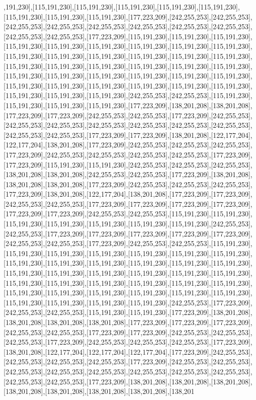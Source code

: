 ,191,230],[115,191,230],[115,191,230],[115,191,230],[115,191,230],[115,191,230],[115,191,230],[115,191,230],[115,191,230],[177,223,209],[242,255,253],[242,255,253],[242,255,253],[242,255,253],[242,255,253],[242,255,253],[242,255,253],[242,255,253],[242,255,253],[242,255,253],[177,223,209],[115,191,230],[115,191,230],[115,191,230],[115,191,230],[115,191,230],[115,191,230],[115,191,230],[115,191,230],[115,191,230],[115,191,230],[115,191,230],[115,191,230],[115,191,230],[115,191,230],[115,191,230],[115,191,230],[115,191,230],[115,191,230],[115,191,230],[115,191,230],[115,191,230],[115,191,230],[115,191,230],[115,191,230],[115,191,230],[115,191,230],[115,191,230],[115,191,230],[115,191,230],[115,191,230],[115,191,230],[115,191,230],[115,191,230],[115,191,230],[115,191,230],[115,191,230],[242,255,253],[242,255,253],[115,191,230],[115,191,230],[115,191,230],[115,191,230],[177,223,209],[138,201,208],[138,201,208],[177,223,209],[177,223,209],[242,255,253],[242,255,253],[177,223,209],[242,255,253],[242,255,253],[242,255,253],[242,255,253],[242,255,253],[242,255,253],[242,255,253],[242,255,253],[242,255,253],[177,223,209],[177,223,209],[138,201,208],[122,177,204],[122,177,204],[138,201,208],[177,223,209],[242,255,253],[242,255,253],[242,255,253],[177,223,209],[242,255,253],[242,255,253],[242,255,253],[242,255,253],[177,223,209],[177,223,209],[115,191,230],[115,191,230],[242,255,253],[242,255,253],[242,255,253],[138,201,208],[138,201,208],[242,255,253],[242,255,253],[177,223,209],[138,201,208],[138,201,208],[138,201,208],[177,223,209],[242,255,253],[242,255,253],[242,255,253],[177,223,209],[138,201,208],[122,177,204],[138,201,208],[177,223,209],[177,223,209],[242,255,253],[242,255,253],[177,223,209],[177,223,209],[177,223,209],[177,223,209],[177,223,209],[177,223,209],[242,255,253],[242,255,253],[115,191,230],[115,191,230],[115,191,230],[115,191,230],[115,191,230],[115,191,230],[115,191,230],[242,255,253],[242,255,253],[177,223,209],[177,223,209],[177,223,209],[177,223,209],[177,223,209],[242,255,253],[242,255,253],[177,223,209],[242,255,253],[242,255,253],[115,191,230],[115,191,230],[115,191,230],[115,191,230],[115,191,230],[115,191,230],[115,191,230],[115,191,230],[115,191,230],[115,191,230],[115,191,230],[115,191,230],[115,191,230],[115,191,230],[115,191,230],[115,191,230],[115,191,230],[115,191,230],[115,191,230],[115,191,230],[115,191,230],[115,191,230],[115,191,230],[115,191,230],[115,191,230],[115,191,230],[115,191,230],[115,191,230],[115,191,230],[115,191,230],[115,191,230],[115,191,230],[115,191,230],[115,191,230],[115,191,230],[242,255,253],[177,223,209],[242,255,253],[242,255,253],[115,191,230],[115,191,230],[177,223,209],[138,201,208],[138,201,208],[138,201,208],[138,201,208],[177,223,209],[177,223,209],[177,223,209],[242,255,253],[242,255,253],[177,223,209],[177,223,209],[242,255,253],[242,255,253],[242,255,253],[177,223,209],[242,255,253],[242,255,253],[242,255,253],[177,223,209],[138,201,208],[122,177,204],[122,177,204],[122,177,204],[177,223,209],[242,255,253],[242,255,253],[242,255,253],[242,255,253],[177,223,209],[242,255,253],[242,255,253],[242,255,253],[242,255,253],[242,255,253],[242,255,253],[242,255,253],[242,255,253],[242,255,253],[242,255,253],[177,223,209],[138,201,208],[138,201,208],[138,201,208],[138,201,208],[138,201,208],[138,201,208],[138,201,208],[138,201